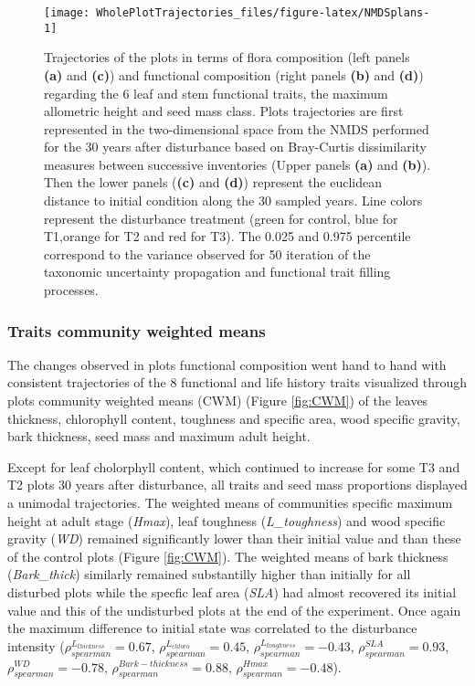 \documentclass[fleqn,10pt]{ArtEcoFoG} %
\theoremstyle{definition}
\theoremstyle{definition}
\theoremstyle{definition}
\theoremstyle{remark}
\begin{document}
\begin{figure*}

{\centering \texttt{[image: WholePlotTrajectories\_files/figure-latex/NMDSplans-1]} 

}

\caption{Trajectories of the plots in terms of flora composition (left panels \textbf{(a)} and \textbf{(c)}) and functional composition (right panels \textbf{(b)} and \textbf{(d)}) regarding the 6 leaf and stem functional traits, the maximum allometric height and seed mass class. Plots trajectories are first represented in the two-dimensional space from the NMDS performed for the 30 years after disturbance based on Bray-Curtis dissimilarity measures between successive inventories (Upper panels \textbf{(a)} and \textbf{(b)}). Then the lower panels (\textbf{(c)} and \textbf{(d)}) represent the euclidean distance to initial condition along the 30 sampled years. Line colors represent the disturbance treatment (green for control, blue for T1,orange for T2 and red for T3). The 0.025 and 0.975 percentile correspond to the variance observed for 50 iteration of the taxonomic uncertainty propagation and functional trait filling processes.}\label{fig:NMDSplans}
\end{figure*}

\subsubsection{Traits community weighted
means}\label{traits-community-weighted-means}

The changes observed in plots functional composition went hand to hand
with consistent trajectories of the 8 functional and life history traits
visualized through plots community weighted means (CWM) (Figure
\ref{fig:CWM}) of the leaves thickness, chlorophyll content, toughness
and specific area, wood specific gravity, bark thickness, seed mass and
maximum adult height.

Except for leaf cholorphyll content, which continued to increase for
some T3 and T2 plots 30 years after disturbance, all traits and seed
mass proportions displayed a unimodal trajectories. The weighted means
of communities specific maximum height at adult stage (\emph{Hmax}),
leaf toughness (\emph{L\_toughness}) and wood specific gravity
(\emph{WD}) remained significantly lower than their initial value and
than these of the control plots (Figure \ref{fig:CWM}). The weighted
means of bark thickness (\emph{Bark\_thick}) similarly remained
substantilly higher than initially for all disturbed plots while the
specfic leaf area (\emph{SLA}) had almost recovered its initial value
and this of the undisturbed plots at the end of the experiment. Once
again the maximum difference to initial state was correlated to the
disturbance intensity (\(\rho_{spearman}^{L_{thickness}}=0.67\),
\(\rho_{spearman}^{L_{chloro}}=0.45\),
\(\rho_{spearman}^{L_{toughness}}=-0.43\),
\(\rho_{spearman}^{SLA}=0.93\), \(\rho_{spearman}^{WD}=-0.78\),
\(\rho_{spearman}^{Bark-thickness}=0.88\),
\(\rho_{spearman}^{Hmax}=-0.48\)).
\end{document}
